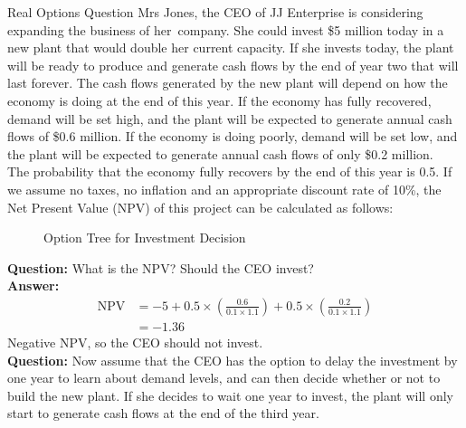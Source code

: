 \begin{examplebox}{Real Options Question}
    Mrs Jones, the CEO of JJ Enterprise is considering expanding the business of her company. She could invest \$5 million today in a new plant that would double her current capacity. If she invests today, the plant will be ready to produce and generate cash flows by the end of year two that will last forever. The cash flows generated by the new plant will depend on how the economy is doing at the end of this year. If the economy has fully recovered, demand will be set high, and the plant will be expected to generate annual cash flows of \$0.6 million. If the economy is doing poorly, demand will be set low, and the plant will be expected to generate annual cash flows of only \$0.2 million. \\

    The probability that the economy fully recovers by the end of this year is 0.5.
    If we assume no taxes, no inflation and an appropriate discount rate of 10\%, the Net Present Value (NPV) of this project can be calculated as follows:


    \begin{figure}[H]
    \centering
    \caption{Option Tree for Investment Decision}
    \label{fig:option-tree}
    \end{figure}

    \textbf{Question: }
    What is the NPV? Should the CEO invest?\\
    \textbf{Answer: }
    \begin{align*}
        \text{NPV} &= -5 + 0.5 \times \left(\frac{0.6}{0.1 \times 1.1} \right) + 0.5 \times \left(\frac{0.2}{0.1 \times 1.1} \right) \\
        &= -1.36
    \end{align*}
    Negative NPV, so the CEO should not invest.\\

    \textbf{Question: }
    Now assume that the CEO has the option to delay the investment by one year to learn about demand levels, and can then decide whether or not to build the new plant. If she decides to wait one year to invest, the plant will only start to generate cash flows at the end of the third year. \\


\end{examplebox}
